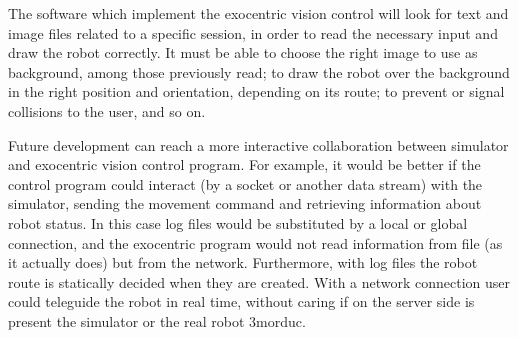 %
The software which implement the exocentric vision control 
will look for text and image files related to a specific 
session, in order to read the necessary input and draw the 
robot correctly. It must be able to choose the right image 
to use as background, among those previously read; to draw 
the robot over the background in the right position and 
orientation, depending on its route; to prevent or signal 
collisions to the user, and so on.
%

%
Future development can reach a more interactive collaboration 
between simulator and exocentric vision control program. For
example, it would be better if the control program could 
interact (by a socket or another data stream) with the 
simulator, sending the movement command and retrieving 
information about robot status. In this case log files 
would be substituted by a local or global connection, 
and the exocentric program would not read information from 
file (as it actually does) but from the network.
Furthermore, with log files the robot route is statically 
decided when they are created. With a network connection user
could teleguide the robot in real time, without caring 
if on the server side is present the simulator or the real 
robot 3morduc.
